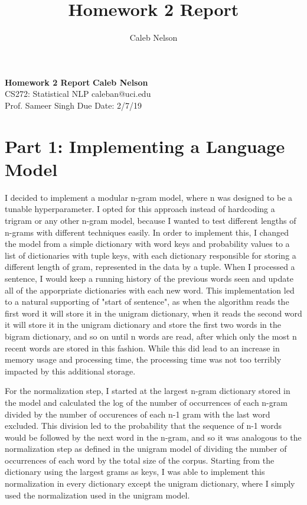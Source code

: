\documentclass{article}
\title{Homework 2 Report}
\author{Caleb Nelson}
\begin{document}
\noindent\large\textbf{Homework 2 Report} \hfill \textbf{Caleb Nelson} \\
\normalsize CS272: Statistical NLP \hfill  caleban@uci.edu \\
\normalsize Prof. Sameer Singh \hfill  Due Date: 2/7/19 \\

\section{Part 1: Implementing a Language Model}

\qquad I decided to implement a modular n-gram model, where n was designed to be a tunable hyperparameter. I opted for this approach instead of hardcoding a trigram or any other n-gram model, because I wanted to test different lengths of n-grams with different techniques easily. In order to implement this, I changed the model from a simple dictionary with word keys and probability values to a list of dictionaries with tuple keys, with each dictionary responsible for storing a different length of gram, represented in the data by a tuple. When I processed a sentence, I would keep a running history of the previous words seen and update all of the apporpriate dictionaries with each new word. This implementation led to a natural supporting of "start of sentence", as when the algorithm reads the first word it will store it in the unigram dictionary, when it reads the second word it will store it in the unigram dictionary and store the first two words in the bigram dictionary, and so on until n words are read, after which only the most n recent words are stored in this fashion. While this did lead to an increase in memory usage and processing time, the processing time was not too terribly impacted by this additional storage.

\quad For the normalization step, I started at the largest n-gram dictionary stored in the model and calculated the log of the number of occurrences of each n-gram divided by the number of occurences of each n-1 gram with the last word excluded. This division led to the probability that the sequence of n-1 words would be followed by the next word in the n-gram, and so it was analogous to the normalization step as defined in the unigram model of dividing the number of occurrences of each word by the total size of the corpus. Starting from the dictionary using the largest grams as keys, I was able to implement this normalization in every dictionary except the unigram dictionary, where I simply used the normalization used in the unigram model.
\end{document}

